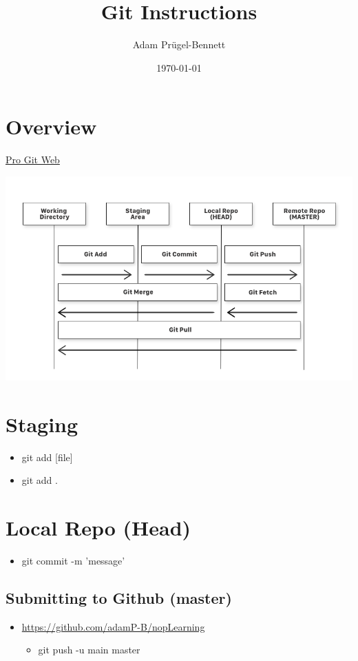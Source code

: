 \documentclass[11pt]{article}
\author{Adam Prügel-Bennett}
\date{\today}
\title{Git Instructions}
\begin{document}
\maketitle
\tableofcontents


\section{Overview}
\label{sec:orgedaaa25}
\href{https://git-scm.com/book/en/v2/Getting-Started-About-Version-Control}{Pro Git Web}
\begin{center}
\includegraphics[width=.9\linewidth]{./git.png}
\end{center}

\section{Staging}
\label{sec:orgf2368b2}
\begin{itemize}
\item git add [file]
\item git add .
\end{itemize}

\section{Local Repo (Head)}
\label{sec:orge5d9e42}
\begin{itemize}
\item git commit -m 'message'
\end{itemize}

\subsection{Submitting to Github (master)}
\label{sec:orgd92bd12}
\begin{itemize}
\item \url{https://github.com/adamP-B/nopLearning}
\begin{itemize}
\item git push -u main master
\end{itemize}
\end{itemize}
\end{document}
